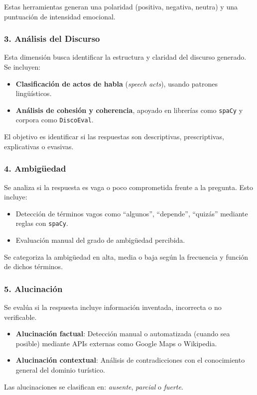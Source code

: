 \documentclass[10pt]{article}
\begin{document}
Estas herramientas generan una polaridad (positiva, negativa, neutra) y una puntuación de intensidad emocional.

\subsubsection*{3. Análisis del Discurso}

Esta dimensión busca identificar la estructura y claridad del discurso generado. Se incluyen:

\begin{itemize}
    \item \textbf{Clasificación de actos de habla} (\emph{speech acts}), usando patrones lingüísticos.
    \item \textbf{Análisis de cohesión y coherencia}, apoyado en librerías como \texttt{spaCy} y corpora como \texttt{DiscoEval}.
\end{itemize}

El objetivo es identificar si las respuestas son descriptivas, prescriptivas, explicativas o evasivas.

\subsubsection*{4. Ambigüedad}

Se analiza si la respuesta es vaga o poco comprometida frente a la pregunta. Esto incluye:

\begin{itemize}
    \item Detección de términos vagos como ``algunos'', ``depende'', ``quizás'' mediante reglas con \texttt{spaCy}.
    \item Evaluación manual del grado de ambigüedad percibida.
\end{itemize}

Se categoriza la ambigüedad en alta, media o baja según la frecuencia y función de dichos términos.

\subsubsection*{5. Alucinación}

Se evalúa si la respuesta incluye información inventada, incorrecta o no verificable.

\begin{itemize}
    \item \textbf{Alucinación factual}: Detección manual o automatizada (cuando sea posible) mediante APIs externas como Google Maps o Wikipedia.
    \item \textbf{Alucinación contextual}: Análisis de contradicciones con el conocimiento general del dominio turístico.
\end{itemize}

Las alucinaciones se clasifican en: \emph{ausente}, \emph{parcial} o \emph{fuerte}.
\end{document}
